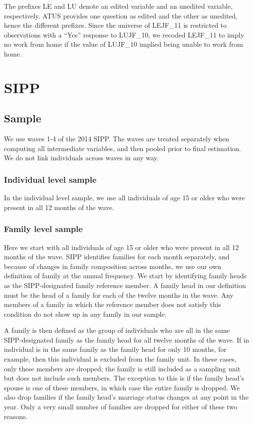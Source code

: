 \documentclass{article}
\begin{document}
The prefixes LE and LU denote an edited variable and an unedited variable, respectively. ATUS provides one question as edited and the other as unedited, hence the different prefixes. Since the universe of LEJF\_11 is restricted to observations with a ``Yes'' response to LUJF\_10, we recoded LEJF\_11 to imply no work from home if the value of LUJF\_10 implied being unable to work from home.

\section{SIPP}
\subsection{Sample}
We use waves 1-4 of the 2014 SIPP. The waves are treated separately when computing all intermediate variables, and then pooled prior to final estimation. We do not link individuals across waves in any way.

\subsubsection{Individual level sample}
In the individual level sample, we use all individuals of age 15 or older who were present in all 12 months of the wave.

\subsubsection{Family level sample}
Here we start with all individuals of age 15 or older who were present in all 12 months of the wave. SIPP identifies families for each month separately, and because of changes in family composition across months, we use our own definition of family at the annual frequency. We start by identifying family heads as the SIPP-designated family reference member. A family head in our definition must be the head of a family for each of the twelve months in the wave. Any members of a family in which the reference member does not satisfy this condition do not show up in any family in our sample.

A family is then defined as the group of individuals who are all in the same SIPP-designated family as the family head for all twelve months of the wave. If in individual is in the same family as the family head for only 10 months, for example, then this individual is excluded from the family unit. In these cases, only these members are dropped; the family is still included as a sampling unit but does not include such members. The exception to this is if the family head's spouse is one of these members, in which case the entire family is dropped. We also drop families if the family head's marriage status changes at any point in the year. Only a very small number of families are dropped for either of these two reasons.
\end{document}
